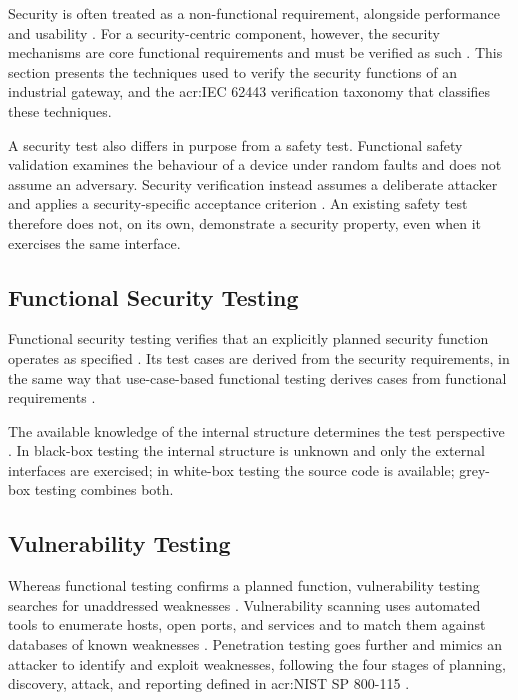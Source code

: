 Security is often treated as a non-functional requirement, alongside performance and usability \cite[p. 291]{tauqeer2021analysis}. For a security-centric component, however, the security mechanisms are core functional requirements and must be verified as such \cite[p. 61]{Barz2025}. This section presents the techniques used to verify the security functions of an industrial gateway, and the \gls{acr:IEC} 62443 verification taxonomy that classifies these techniques.

A security test also differs in purpose from a safety test. Functional safety validation examines the behaviour of a device under random faults and does not assume an adversary. Security verification instead assumes a deliberate attacker and applies a security-specific acceptance criterion \cite[p. 70]{Wurm2022}. An existing safety test therefore does not, on its own, demonstrate a security property, even when it exercises the same interface. 

\subsection{Functional Security Testing}
\label{subsec:functional_security_testing}

Functional security testing verifies that an explicitly planned security function operates as specified \cite[p. 82]{1341418} \cite[p. 8]{richier2011security}. Its test cases are derived from the security requirements, in the same way that use-case-based functional testing derives cases from functional requirements \cite[p. 56]{JOT:issue_2003_01/column6}. 

The available knowledge of the internal structure determines the test perspective \cite[p. 296]{tauqeer2021analysis}. In black-box testing the internal structure is unknown and only the external interfaces are exercised; in white-box testing the source code is available; grey-box testing combines both.

\subsection{Vulnerability Testing}
\label{subsec:vulnerabilities_fuzzing_pentesting}

Whereas functional testing confirms a planned function, vulnerability testing searches for unaddressed weaknesses \cite[p. 8]{richier2011security}. Vulnerability scanning uses automated tools to enumerate hosts, open ports, and services and to match them against databases of known weaknesses \cite[p. 27]{nist_sp800_115}. Penetration testing goes further and mimics an attacker to identify and exploit weaknesses, following the four stages of planning, discovery, attack, and reporting defined in \gls{acr:NIST} SP 800-115 \cite[p. 37]{nist_sp800_115}.

